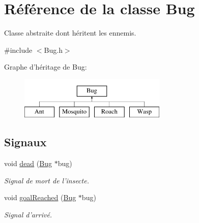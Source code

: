\hypertarget{classBug}{
\section{Référence de la classe Bug}
\label{classBug}
}


Classe abstraite dont héritent les ennemis.  




{\ttfamily \#include $<$Bug.h$>$}

Graphe d'héritage de Bug:\begin{figure}[H]
\begin{center}
\leavevmode
\includegraphics[height=2.000000cm]{classBug}
\end{center}
\end{figure}
\subsection*{Signaux}
\begin{DoxyCompactItemize}
\item 
void \hyperlink{classBug_ab7379f5a0172e2d536e20f3f29915e02}{dead} (\hyperlink{classBug}{Bug} $\ast$bug)
\begin{DoxyCompactList}\small\item\em Signal de mort de l'insecte. \end{DoxyCompactList}\item 
void \hyperlink{classBug_a33f90dffa55e1dce80dc2416c75a53c8}{goalReached} (\hyperlink{classBug}{Bug} $\ast$bug)
\begin{DoxyCompactList}\small\item\em Signal d'arrivé. \end{DoxyCompactList}\end{DoxyCompactItemize}
